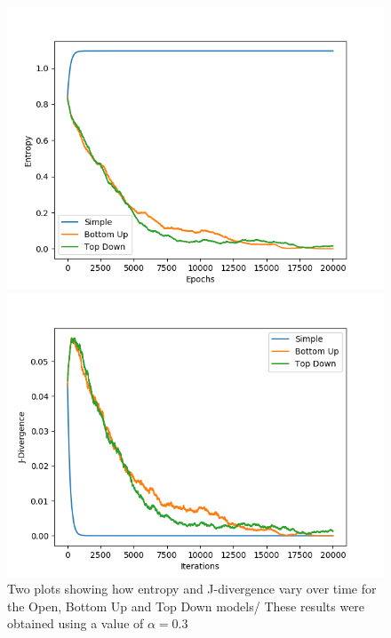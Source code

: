 \begin{figure}[H]
 \centering
  \begin{minipage}[ht]{0.49\textwidth}
    \includegraphics[width=\textwidth]{Images/Figures/Entropy/ALL_n_3_p_100_gamma_0,5_alpha_0,5.png}
 \end{minipage}
 \hfill
 \begin{minipage}[ht]{0.49\textwidth}
    \includegraphics[width=\textwidth]{Images/Figures/All/ALL_n_3_p_100_gamma_0,5_alpha_0,5.png}
 \end{minipage}
 \caption{Two plots showing how entropy and J-divergence vary over time for the Open, Bottom Up and Top Down models/ These results were obtained using a value of $\alpha = 0.3$}\label{fig:entropy_J_all}
\end{figure}


